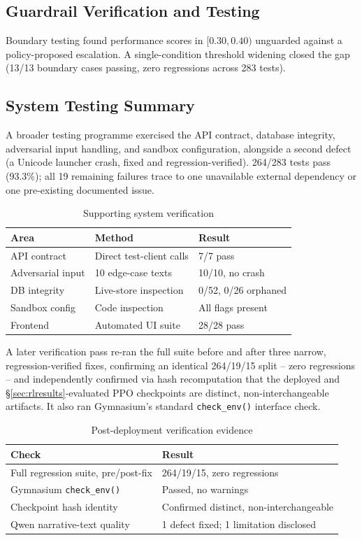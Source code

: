 \documentclass[conference]{IEEEtran}
\begin{document}
\subsection{Guardrail Verification and Testing}

Boundary testing found performance scores in $[0.30, 0.40)$ unguarded against a policy-proposed escalation. A single-condition threshold widening closed the gap (13/13 boundary cases passing, zero regressions across 283 tests).

\subsection{System Testing Summary}

A broader testing programme exercised the API contract, database integrity, adversarial input handling, and sandbox configuration, alongside a second defect (a Unicode launcher crash, fixed and regression-verified). 264/283 tests pass (93.3\%); all 19 remaining failures trace to one unavailable external dependency or one pre-existing documented issue.

\begin{table}[t]
\caption{Supporting system verification}
\centering
\begin{tabular}{p{2.1cm}p{3.0cm}p{1.9cm}}
\toprule
Area & Method & Result \\
\midrule
API contract & Direct test-client calls & 7/7 pass \\
Adversarial input & 10 edge-case texts & 10/10, no crash \\
DB integrity & Live-store inspection & 0/52, 0/26 orphaned \\
Sandbox config & Code inspection & All flags present \\
Frontend & Automated UI suite & 28/28 pass \\
\bottomrule
\end{tabular}
\end{table}

A later verification pass re-ran the full suite before and after three narrow, regression-verified fixes, confirming an identical 264/19/15 split -- zero regressions -- and independently confirmed via hash recomputation that the deployed and \S\ref{sec:rlresults}-evaluated PPO checkpoints are distinct, non-interchangeable artifacts. It also ran Gymnasium's standard \texttt{check\_env()} interface check.

\begin{table}[t]
\caption{Post-deployment verification evidence}
\centering
\begin{tabular}{p{3.6cm}p{3.4cm}}
\toprule
Check & Result \\
\midrule
Full regression suite, pre/post-fix & 264/19/15, zero regressions \\
Gymnasium \texttt{check\_env()} & Passed, no warnings \\
Checkpoint hash identity & Confirmed distinct, non-interchangeable \\
Qwen narrative-text quality & 1 defect fixed; 1 limitation disclosed \\
\bottomrule
\end{tabular}
\end{table}
\end{document}
